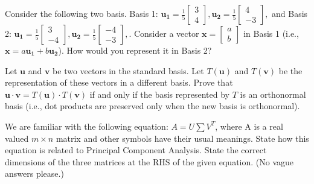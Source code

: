 \documentclass[solution,addpoints,12pt]{exam}
\begin{document}
\begin{questions}


\question[2] 
Consider the following two basis. Basis 1: $\mathbf{u_1} = \frac{1}{5}\begin{bmatrix} 3 \\ 4 \end{bmatrix}, \mathbf{u_2} = \frac{1}{5}\begin{bmatrix} 4 \\ -3 \end{bmatrix},$ and Basis 2: $\mathbf{u_1} = \frac{1}{5}\begin{bmatrix} 3 \\ -4 \end{bmatrix}, \mathbf{u_2} = \frac{1}{5}\begin{bmatrix} -4 \\ -3 \end{bmatrix},$. Consider a vector $\mathbf{x} = \begin{bmatrix} a \\ b \end{bmatrix}$ in Basis 1 (i.e., $\mathbf{x} = a \mathbf{u_1} + b \mathbf{u_2}$). How would you represent it in Basis 2?
\begin{solution}

\end{solution}

\question[1] 
Let $\mathbf{u}$ and $\mathbf{v}$ be two vectors in the standard basis. Let $T(\mathbf{u})$ and $T(\mathbf{v})$ be the representation of these vectors in a different basis. Prove that $\mathbf{u}\cdot\mathbf{v} = T(\mathbf{u})\cdot T(\mathbf{v})$ if and only if the basis represented by $T$ is an orthonormal basis (i.e., dot products are preserved only when the new basis is orthonormal).
\begin{solution}

\end{solution}

\question[1] 
We are familiar with the following equation: $A=U \sum V^T$, where A is a real valued $m\times n$ matrix and other symbols have their usual meanings. State how this equation is related to Principal Component Analysis. State the correct dimensions of the three matrices at the RHS of the given equation. (No vague answers please.)
\begin{solution}


\end{solution}
\end{questions}
\end{document}
